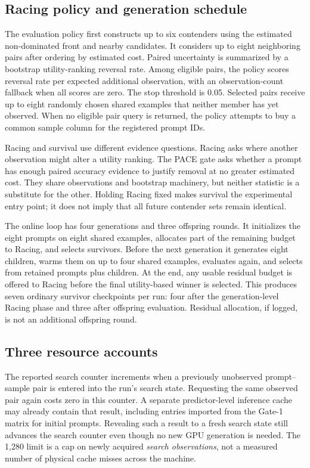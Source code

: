 \subsection{Racing policy and generation schedule}
The evaluation policy first constructs up to six contenders using the estimated
non-dominated front and nearby candidates. It considers up to eight neighboring
pairs after ordering by estimated cost. Paired uncertainty is summarized by a
bootstrap utility-ranking reversal rate. Among eligible pairs, the policy scores
reversal rate per expected additional observation, with an observation-count
fallback when all scores are zero. The stop threshold is 0.05. Selected pairs
receive up to eight randomly chosen shared examples that neither member has yet
observed. When no eligible pair query is returned, the policy attempts to buy a
common sample column for the registered prompt IDs.

Racing and survival use different evidence questions. Racing asks where another
observation might alter a utility ranking. The PACE gate asks whether a prompt
has enough paired accuracy evidence to justify removal at no greater estimated
cost. They share observations and bootstrap machinery, but neither statistic is
a substitute for the other. Holding Racing fixed makes survival the experimental
entry point; it does not imply that all future contender sets remain identical.

The online loop has four generations and three offspring rounds. It initializes
the eight prompts on eight shared examples, allocates part of the remaining
budget to Racing, and selects survivors. Before the next generation it generates
eight children, warms them on up to four shared examples, evaluates again, and
selects from retained prompts plus children. At the end, any usable residual
budget is offered to Racing before the final utility-based winner is selected.
This produces seven ordinary survivor checkpoints per run: four after the
generation-level Racing phase and three after offspring evaluation. Residual
allocation, if logged, is not an additional offspring round.

\subsection{Three resource accounts}
\label{sec:accounting}
The reported search counter increments when a previously unobserved
prompt--sample pair is entered into the run's search state. Requesting the same
observed pair again costs zero in this counter. A separate predictor-level inference
cache may already contain that result, including entries imported from the
Gate-1 matrix for initial prompts. Revealing such a result to a fresh search
state still advances the search counter even though no new GPU generation is
needed. The 1,280 limit is a cap on newly acquired \emph{search
observations}, not a measured number of physical cache misses across the machine.

